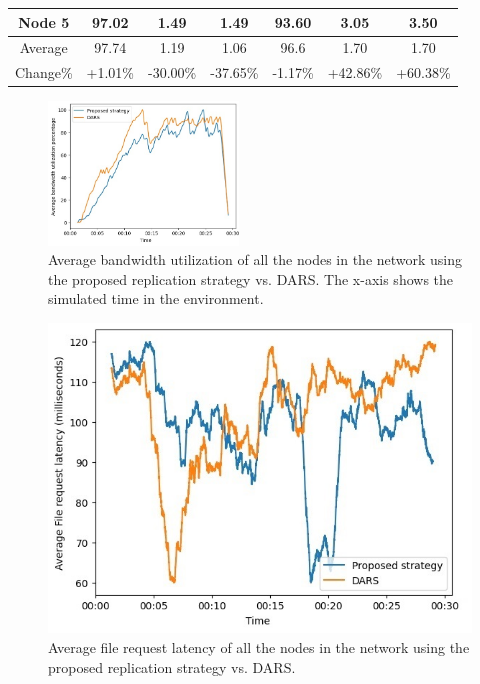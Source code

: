 \documentclass[10pt, conference]{IEEEtran}
\begin{document}
\begin{table}[htbp]
{\begin{tabular}{ccccccc}
\vspace{1pt}
Node 5                         & 97.02         & 1.49           & 1.49          & 93.60     & 3.05      & 3.50      \\ \hline
\vspace{2pt}
Average                        & 97.74         & 1.19           & 1.06          & 96.6      & 1.70      & 1.70      \\ \hline
\vspace{2pt}
Change\%                       & +1.01\%       & -30.00\%       & -37.65\%      & -1.17\%   & +42.86\%  & +60.38\%  \\ \hline
\end{tabular}%
}
\end{table}

\begin{figure}[htbp]
    \centering
    \includegraphics[width=0.45\textwidth]
    {project/fig/bandwidth.jpg}
    \caption{Average bandwidth utilization of all the nodes in the network using the proposed replication strategy vs. DARS. The x-axis shows the simulated time in the environment.}
    \label{fig:bandwidth}
\end{figure}

\begin{figure}[htbp]
    \centering
    \includegraphics[width=\columnwidth]
    {project/fig/latency.jpg}
    \caption{Average file request latency of all the nodes in the network using the proposed replication strategy vs. DARS.}
    \label{fig:latency}
\end{figure}
\end{document}
